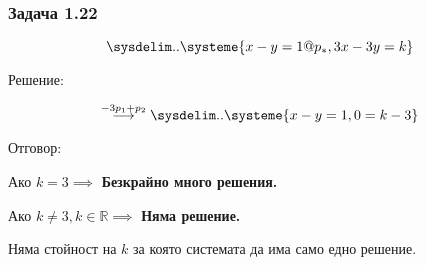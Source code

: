 \documentclass{subfiles}
\begin{document}
\subsubsection{Задача 1.22}

\begin{equation*}
    \sysdelim..\systeme{
        x - y = 1@p_{*},
        3x - 3y = k
    }
\end{equation*}

\noindent Решение:

\begin{equation*}
    \overset{-3p_{1} + p_{2}}{\longrightarrow}
    \sysdelim..\systeme{
        x - y = 1,
        0 = k - 3
    }
\end{equation*}

\noindent Отговор:

\noindent Ако $k = 3 \implies$ \textbf{Безкрайно много решения.}

\noindent Ако $k \neq 3, k \in \mathbb{R} \implies$ \textbf{Няма решение.}

\noindent Няма стойност на $k$ за която системата да има само едно решение.
\end{document}
